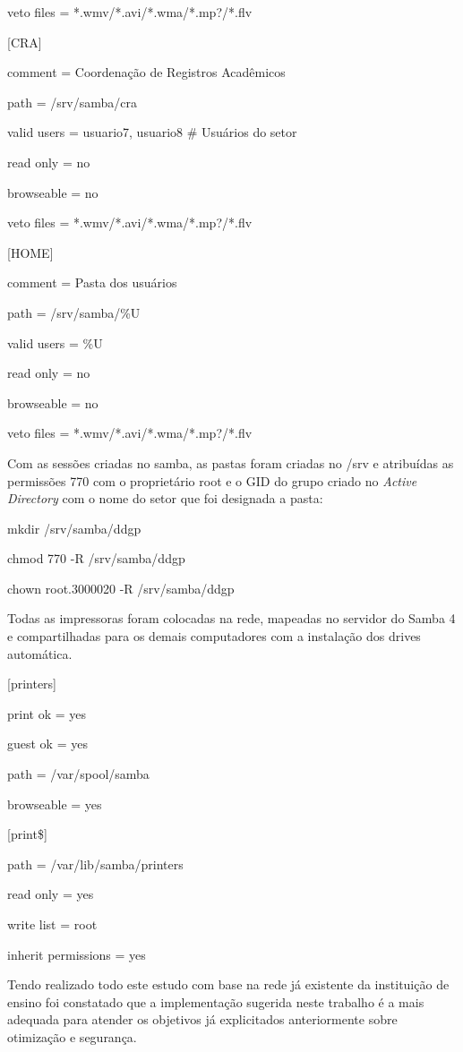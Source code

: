 veto files = *.wmv/*.avi/*.wma/*.mp?/*.flv

[CRA] 

comment = Coordenação de Registros Acadêmicos

path = /srv/samba/cra

valid users = usuario7, usuario8 \# Usuários do setor

read only = no

browseable = no

veto files = *.wmv/*.avi/*.wma/*.mp?/*.flv


[HOME] 

comment = Pasta dos usuários

path = /srv/samba/\%U

valid users = \%U

read only = no

browseable = no

veto files = *.wmv/*.avi/*.wma/*.mp?/*.flv

Com as sessões criadas no samba, as pastas foram criadas no /srv e atribuídas as permissões 770 com o proprietário root e o GID do grupo criado no \textit{Active Directory} com o nome do setor que foi designada a pasta:

mkdir /srv/samba/ddgp

chmod 770 -R /srv/samba/ddgp

chown root.3000020 -R /srv/samba/ddgp

Todas as impressoras foram colocadas na rede, mapeadas no servidor do Samba 4 e compartilhadas para os demais computadores com a instalação dos drives automática.

[printers] 

print ok = yes 

guest ok = yes

path = /var/spool/samba 

browseable = yes

[print\$] 

path = /var/lib/samba/printers 

read only = yes

write list = root 

inherit permissions = yes

Tendo realizado todo este estudo com base na rede já existente da instituição de ensino foi constatado que a implementação sugerida neste trabalho é a mais adequada para atender os objetivos já explicitados anteriormente sobre otimização e segurança.
